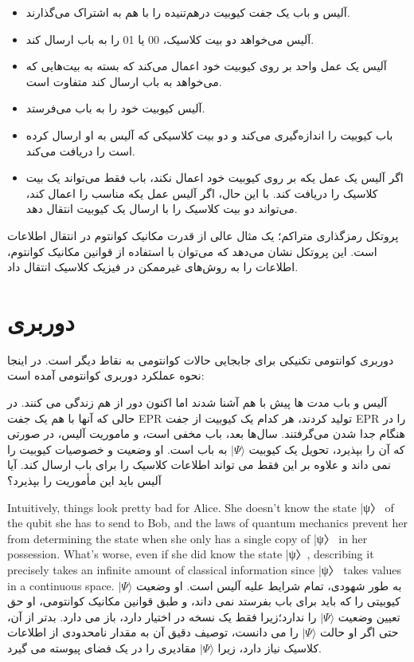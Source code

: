 \documentclass{book}
\begin{document}
\begin{itemize}
	\item آلیس و باب یک جفت کیوبیت درهم‌تنیده را با هم به اشتراک می‌گذارند.
	\item آلیس می‌خواهد دو بیت کلاسیک، 00 یا 01 را به باب ارسال کند.
	\item آلیس یک عمل واحد بر روی کیوبیت خود اعمال می‌کند که بسته به بیت‌هایی که می‌خواهد به باب ارسال کند متفاوت است.
	\item آلیس کیوبیت خود را به باب می‌فرستد.
	\item باب کیوبیت را اندازه‌گیری می‌کند و دو بیت کلاسیکی که آلیس به او ارسال کرده است را دریافت می‌کند.
	\item اگر آلیس یک عمل یکه بر روی کیوبیت خود اعمال نکند، باب فقط می‌تواند یک بیت کلاسیک را دریافت کند. با این حال، اگر آلیس عمل یکه مناسب را اعمال کند، می‌تواند دو بیت کلاسیک را با ارسال یک کیوبیت انتقال دهد.
\end{itemize}

پروتکل رمزگذاری متراکم؛ یک مثال عالی از قدرت مکانیک کوانتوم در انتقال اطلاعات است. این پروتکل نشان می‌دهد که می‌توان با استفاده از قوانین مکانیک کوانتوم، اطلاعات را به روش‌های غیرممکن در فیزیک کلاسیک انتقال داد.
\newpage
\section{دوربری}
دوربری کوانتومی تکنیکی برای جابجایی حالات کوانتومی به نقاط دیگر است. در اینجا نحوه عملکرد دوربری کوانتومی آمده است:

 آلیس و باب مدت ها پیش با هم آشنا شدند اما اکنون دور از هم زندگی می کنند. در حالی که آنها با هم یک جفت EPR تولید کردند، هر کدام یک کیوبیت از جفت EPR را در هنگام جدا شدن می‌گرفتند. سال‌ها بعد، باب مخفی است، و ماموریت آلیس، در صورتی که آن را بپذیرد، تحویل یک کیوبیت $\vert \Psi \rangle$ به باب است. او وضعیت  و خصوصیات کیوبیت را نمی داند و علاوه بر این فقط می تواند اطلاعات کلاسیک را برای باب ارسال کند. آیا آلیس باید این مأموریت را بپذیرد؟


Intuitively, things look pretty bad for Alice. She doesn’t know the state |ψ〉 of the qubit she has to send to Bob, and the laws of quantum mechanics prevent her from determining the state when she only has a single copy of |ψ〉 in her possession. What’s worse, even if she did know the state |ψ〉, describing it precisely takes an infinite amount of classical information since |ψ〉 takes values in a continuous space.
به طور شهودی، تمام شرایط علیه آلیس است. او وضعیت $\vert \Psi \rangle$ کیوبیتی را که باید برای باب بفرستد نمی داند، و طبق قوانین مکانیک کوانتومی، او حق تعیین وضعیت $\vert \Psi \rangle$ را ندارد؛‌زیرا فقط یک نسخه در اختیار دارد، باز می دارد. بدتر از آن، حتی اگر او حالت $\vert \Psi \rangle$ را می دانست، توصیف دقیق آن به مقدار نامحدودی از اطلاعات کلاسیک نیاز دارد، زیرا $\vert \Psi \rangle$ مقادیری را در یک فضای پیوسته می گیرد.
\end{document}
